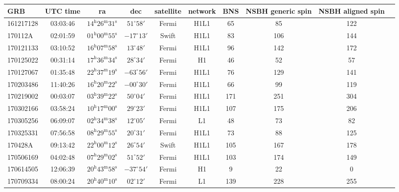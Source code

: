 \documentclass[11pt]{cuthesis}
\begin{document}
\begin{landscape}
\begin{tabular}{l c  c  c  c  c  c  c  c c |}
\hline
 GRB & UTC time & ra & dec & satellite & network & BNS & NSBH generic spin & NSBH aligned spin \\
\hline
161217128 & 03:03:46  & $14^{\mathrm{h}}26^{\mathrm{m}}31^{\mathrm{s}}$ & $51^{\circ}58'$ &  Fermi   & H1L1   & 65  & 85  & 122 \\
170112A   & 02:01:59  & $01^{\mathrm{h}}00^{\mathrm{m}}55^{\mathrm{s}}$ & $-17^{\circ}13'$ & Swift   & H1L1   & 83  & 106 & 144 \\
170121133 & 03:10:52  & $16^{\mathrm{h}}07^{\mathrm{m}}58^{\mathrm{s}}$ & $13^{\circ}48'$ &  Fermi   & H1L1   & 96  & 142 & 172 \\
170125022 & 00:31:14  & $17^{\mathrm{h}}36^{\mathrm{m}}34^{\mathrm{s}}$ & $28^{\circ}34'$ &  Fermi   & H1     & 46  & 52  & 57 \\
170127067 & 01:35:48  & $22^{\mathrm{h}}37^{\mathrm{m}}19^{\mathrm{s}}$ & $-63^{\circ}56'$ & Fermi   & H1L1   & 76  & 129 & 141 \\
170203486 & 11:40:26  & $16^{\mathrm{h}}20^{\mathrm{m}}22^{\mathrm{s}}$ & $-00^{\circ}30'$ & Fermi   & H1L1   & 66  & 99  & 119 \\
170219002 & 00:03:07  & $03^{\mathrm{h}}39^{\mathrm{m}}22^{\mathrm{s}}$ & $50^{\circ}04'$ &  Fermi   & H1L1   & 171 & 251 & 304 \\
170302166 & 03:58:24  & $10^{\mathrm{h}}17^{\mathrm{m}}00^{\mathrm{s}}$ & $29^{\circ}23'$ &  Fermi   & H1L1   & 107 & 175 & 206 \\
170305256 & 06:09:07  & $02^{\mathrm{h}}34^{\mathrm{m}}38^{\mathrm{s}}$ & $12^{\circ}05'$ &  Fermi   & L1     & 48  & 73  & 82 \\
170325331 & 07:56:58  & $08^{\mathrm{h}}29^{\mathrm{m}}55^{\mathrm{s}}$ & $20^{\circ}31'$ &  Fermi   & H1L1   & 73  & 88  & 125 \\
170428A   & 09:13:42  & $22^{\mathrm{h}}00^{\mathrm{m}}12^{\mathrm{s}}$ & $26^{\circ}54'$ &  Swift   & H1L1   & 105 & 167 & 178 \\
170506169 & 04:02:48  & $07^{\mathrm{h}}29^{\mathrm{m}}02^{\mathrm{s}}$ & $51^{\circ}52'$ &  Fermi   & H1L1   & 103 & 174 & 149 \\
170614505 & 12:06:39  & $20^{\mathrm{h}}43^{\mathrm{m}}58^{\mathrm{s}}$ & $-37^{\circ}54'$ & Fermi   & H1     & 9   & 22  & 0 \\
170709334 & 08:00:24  & $20^{\mathrm{h}}40^{\mathrm{m}}10^{\mathrm{s}}$ & $02^{\circ}12'$ &  Fermi   & L1     & 139 & 228 & 255 \\

\end{tabular}
\end{landscape}
\end{document}
